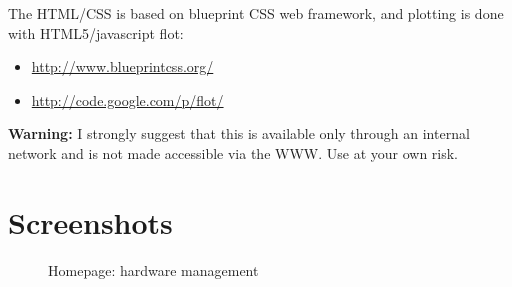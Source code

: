 \documentclass[letterpaper,10pt,english]{sphinxmanual}
\begin{document}
The HTML/CSS is based on blueprint CSS web framework, and plotting is done with HTML5/javascript flot:
\begin{itemize}
\item {} 
\href{http://www.blueprintcss.org/}{http://www.blueprintcss.org/}

\item {} 
\href{http://code.google.com/p/flot/}{http://code.google.com/p/flot/}

\end{itemize}

\textbf{Warning:} I strongly suggest that this is available only through an internal network and
is not made accessible via the WWW. Use at your own risk.


\chapter{Screenshots}
\label{index:screenshots}\begin{figure}[htbp]
\centering
\capstart

\caption{Homepage: hardware management}\end{figure}
\end{document}
